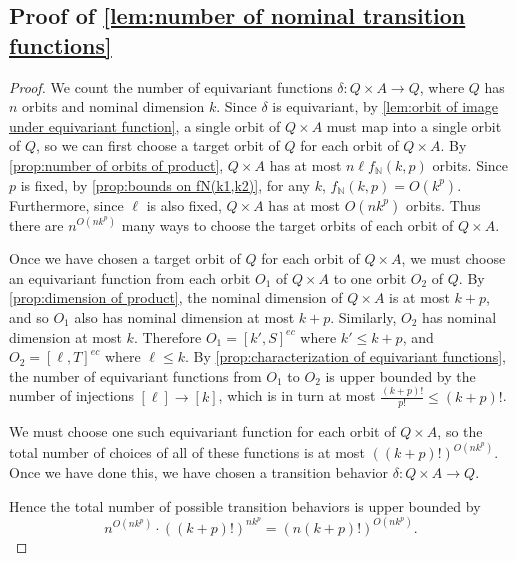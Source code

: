 \documentclass[runningheads]{llncs}
\newcommand{\bb}{\mathbb}
\begin{document}
\subsection{Proof of \autoref{lem:number of nominal transition functions}} \label{appendix:proof of number of nominal transition functions}

\begin{proof}
    We count the number of equivariant functions $\delta : Q \times A \to Q$, where $Q$ has $n$ orbits and nominal dimension $k$. 
    Since $\delta$ is equivariant, by \autoref{lem:orbit of image under equivariant function}, a single orbit of $Q \times A$ must map into a single orbit of $Q$, so we can first choose a target orbit of $Q$ for each orbit of $Q \times A$.
    By \autoref{prop:number of orbits of product}, $Q \times A$ has at most $n \ell f_{\bb N}(k,p)$ orbits.
    Since $p$ is fixed, by \autoref{prop:bounds on fN(k1,k2)}, for any $k$, $f_{\bb N}(k,p) = O(k^{p})$.
    Furthermore, since $\ell$ is also fixed, $Q \times A$ has at most $O(nk^{p})$ orbits.
    Thus there are $n^{O(nk^{p})}$ many ways to choose the target orbits of each orbit of $Q \times A$. 
    
    Once we have chosen a target orbit of $Q$ for each orbit of $Q \times A$, we must choose an equivariant function from each orbit $O_1$ of $Q \times A$ to one orbit $O_2$ of $Q$. 
    By \autoref{prop:dimension of product}, the nominal dimension of $Q \times A$ is at most $k+p$, and so $O_1$ also has nominal dimension at most $k+p$.
    Similarly, $O_2$ has nominal dimension at most $k$. 
    Therefore $O_1 = [k',S]^{ec}$ where $k' \leq k+p$, and $O_2 = [\ell,T]^{ec}$ where $\ell \leq k$.
    By \autoref{prop:characterization of equivariant functions}, the number of equivariant functions from $O_1$ to $O_2$ is upper bounded by the number of injections $[\ell] \to [k]$, which is in turn at most $\frac{(k+p)!}{p!} \leq (k+p)!$.
    
    We must choose one such equivariant function for each orbit of $Q \times A$, so the total number of choices of all of these functions is at most $\left((k+p)!\right)^{O(nk^{p})}$. 
    Once we have done this, we have chosen a transition behavior $\delta : Q \times A \to Q$.
    
    Hence the total number of possible transition behaviors is upper bounded by 
    \[
    n^{O(nk^{p})} \cdot \left((k+p)!\right)^{nk^{p}}= \left(n(k+p)!\right)^{O(nk^{p})}.
    \]
\end{proof}
\end{document}
